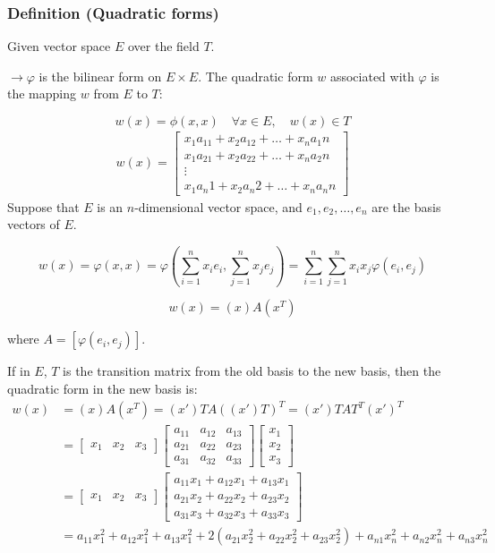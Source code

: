 \subsubsection{Definition (Quadratic forms)}

Given vector space $E$ over the field $T$.

$\rightarrow\varphi$ is the bilinear form on $E \times E$.
The quadratic form $w$ associated with $\varphi$ is the mapping $w$ from $E$ to $T$:

\[
w(x) = \phi(x, x) \quad \forall x \in E, \quad w(x) \in T
\]
\begin{align*}
    w(x)=\begin{bmatrix}
        x_1a_11 + x_2a_12 + \ldots + x_na_1n\\
        x_1a_21 + x_2a_22 + \ldots + x_na_2n\\
        \vdots\\
        x_1a_n1 + x_2a_n2 + \ldots + x_na_nn
    \end{bmatrix}
\end{align*}
Suppose that $E$ is an $n$-dimensional vector space, and $e_1, e_2, \ldots, e_n$ are the basis vectors of $E$.

\[
w(x) = \varphi(x, x) = \varphi\left(\sum_{i=1}^n x_i e_i, \sum_{j=1}^n x_j e_j\right) = \sum_{i=1}^n \sum_{j=1}^n x_i x_j \varphi(e_i, e_j)
\]

\[
w(x) = (x) A (x^T)
\]

where $A = [\varphi(e_i, e_j)]$.

If in $E$, $T$ is the transition matrix from the old basis to the new basis, then the quadratic form in the new basis is:
\begin{align*}
    w(x) &= (x)A(x^T) = (x')T A ((x')T)^T = (x')T AT^T (x')^T\\
    &= \begin{bmatrix}
        x_1 & x_2 & x_3
    \end{bmatrix}
    \begin{bmatrix}
        a_{11} & a_{12} & a_{13}\\
        a_{21} & a_{22} & a_{23}\\
        a_{31} & a_{32} & a_{33}
    \end{bmatrix}
    \begin{bmatrix}
        x_1\\
        x_2\\
        x_3
    \end{bmatrix}\\
    &=\begin{bmatrix}
        x_1 & x_2 & x_3
    \end{bmatrix}
    \begin{bmatrix}
        a_{11}x_1 + a_{12}x_1 + a_{13}x_1\\
        a_{21}x_2 + a_{22}x_2 + a_{23}x_2\\
        a_{31}x_3 + a_{32}x_3 + a_{33}x_3
    \end{bmatrix}\\
    &= a_{11}x_1^2 + a_{12}x_1^2 + a_{13}x_1^2 + 2(a_{21}x_2^2 + a_{22}x_2^2 + a_{23}x_2^2) + a_{n1}x_n^2 + a_{n2}x_n^2 + a_{n3}x_n^2
\end{align*}

